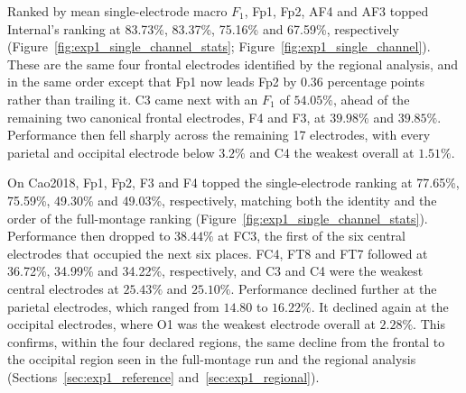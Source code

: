 Ranked by mean single-electrode macro $F_1$, Fp1, Fp2, AF4 and AF3 topped Internal's ranking at 83.73\%, 83.37\%, 75.16\% and 67.59\%, respectively (Figure~\ref{fig:exp1_single_channel_stats}; Figure~\ref{fig:exp1_single_channel}). These are the same four frontal electrodes identified by the regional analysis, and in the same order except that Fp1 now leads Fp2 by 0.36 percentage points rather than trailing it. C3 came next with an $F_1$ of $54.05\%$, ahead of the remaining two canonical frontal electrodes, F4 and F3, at $39.98\%$ and $39.85\%$. Performance then fell sharply across the remaining 17 electrodes, with every parietal and occipital electrode below $3.2\%$ and C4 the weakest overall at $1.51\%$.

On Cao2018, Fp1, Fp2, F3 and F4 topped the single-electrode ranking at 77.65\%, 75.59\%, 49.30\% and 49.03\%, respectively, matching both the identity and the order of the full-montage ranking (Figure~\ref{fig:exp1_single_channel_stats}). Performance then dropped to $38.44\%$ at FC3, the first of the six central electrodes that occupied the next six places. FC4, FT8 and FT7 followed at 36.72\%, 34.99\% and 34.22\%, respectively, and C3 and C4 were the weakest central electrodes at $25.43\%$ and $25.10\%$. Performance declined further at the parietal electrodes, which ranged from $14.80$ to $16.22\%$. It declined again at the occipital electrodes, where O1 was the weakest electrode overall at $2.28\%$. This confirms, within the four declared regions, the same decline from the frontal to the occipital region seen in the full-montage run and the regional analysis (Sections~\ref{sec:exp1_reference} and~\ref{sec:exp1_regional}).

